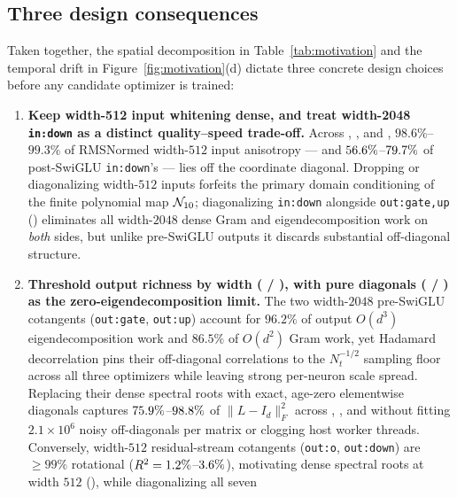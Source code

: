 \subsection{Three design consequences}
\label{sec:mot-consequences}

Taken together, the spatial decomposition in Table~\ref{tab:motivation} and the
temporal drift in Figure~\ref{fig:motivation}(d) dictate three concrete design
choices before any candidate optimizer is trained:

\begin{enumerate}
\item \textbf{Keep width-512 input whitening dense, and treat width-2048
  \texttt{in:down} as a distinct quality--speed trade-off.} Across ,
  , and , $98.6\%$--$99.3\%$ of RMSNormed
  width-$512$ input anisotropy --- and
  $56.6\%$--$79.7\%$ of
  post-SwiGLU \texttt{in:down}'s --- lies off the coordinate diagonal. Dropping
  or diagonalizing width-$512$ inputs forfeits the primary domain conditioning of
  the finite polynomial map $\mathcal{N}_{10}$; diagonalizing \texttt{in:down} alongside
  \texttt{out:gate,up} () eliminates all width-$2048$ dense Gram
  and eigendecomposition work on \emph{both} sides, but unlike pre-SwiGLU
  outputs it discards substantial off-diagonal structure.
\item \textbf{Threshold output richness by width ( / \mlpdiag{}),
  with pure diagonals ( / \alldiag{}) as the
  zero-eigendecomposition limit.} The two width-$2048$ pre-SwiGLU cotangents
  (\texttt{out:gate}, \texttt{out:up}) account for $96.2\%$ of output $O(d^3)$
  eigendecomposition work and $86.5\%$ of $O(d^2)$ Gram work, yet Hadamard
  decorrelation pins their off-diagonal correlations to the $N_t^{-1/2}$
  sampling floor across all three optimizers while leaving strong per-neuron
  scale spread. Replacing their dense spectral roots with exact, age-zero
  elementwise diagonals captures
  $75.9\%$--$98.8\%$ of
  $\|L-I_d\|_F^2$ across , , and 
  without fitting $2.1\times 10^6$ noisy off-diagonals per matrix or clogging
  host worker threads. Conversely, width-$512$ residual-stream cotangents
  (\texttt{out:o}, \texttt{out:down}) are $\ge 99\%$ rotational ($R^2 =
  1.2\%$--$3.6\%$), motivating dense
  spectral roots at width $512$ (), while diagonalizing all seven

\end{enumerate}
